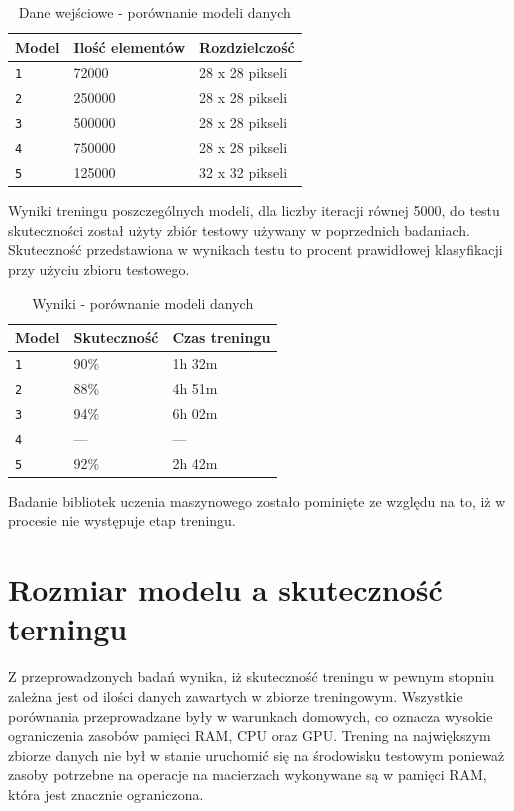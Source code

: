 \documentclass[brudnopis]{xmgr}
\begin{document}
\begin{table}[!htb]
\begin{tabular}{|l|l|l|} \hline
Model & Ilość elementów & Rozdzielczość  \\ \hline
\texttt 1 & 72000 & 28 x 28 pikseli \\ \hline
\texttt 2 & 250000 & 28 x 28 pikseli \\ \hline
\texttt 3 & 500000 & 28 x 28 pikseli \\ \hline
\texttt 4 & 750000 & 28 x 28 pikseli \\ \hline
\texttt 5 & 125000 & 32 x 32 pikseli \\ \hline
\end{tabular}
\caption{Dane wejściowe - porównanie modeli danych}
\end{table}

Wyniki treningu poszczególnych modeli, dla liczby iteracji równej 5000, do testu skuteczności został użyty zbiór testowy używany w poprzednich badaniach. Skuteczność przedstawiona w wynikach testu to procent prawidłowej klasyfikacji przy użyciu zbioru testowego.

\begin{table}[!htb]
\begin{tabular}{|l|l|l|} \hline
Model & Skuteczność & Czas treningu  \\ \hline
\texttt 1 & 90\% & 1h 32m \\ \hline
\texttt 2 & 88\% & 4h 51m \\ \hline
\texttt 3 & 94\% & 6h 02m \\ \hline
\texttt 4 & --- & --- \\ \hline 
\texttt 5 & 92\% & 2h 42m \\ \hline
\end{tabular}
\caption{Wyniki - porównanie modeli danych}
\end{table}

Badanie bibliotek uczenia maszynowego zostało pominięte ze względu na to, iż w procesie nie występuje etap treningu.
\newpage

\section{Rozmiar modelu a skuteczność terningu}

Z przeprowadzonych badań wynika, iż skuteczność treningu w pewnym stopniu zależna jest od ilości danych zawartych w zbiorze treningowym. Wszystkie porównania przeprowadzane były w warunkach domowych, co oznacza wysokie ograniczenia zasobów pamięci RAM, CPU oraz GPU. Trening na największym zbiorze danych nie był w stanie uruchomić się na środowisku testowym ponieważ zasoby potrzebne na operacje na macierzach wykonywane są w pamięci RAM, która jest znacznie ograniczona. 
\end{document}
